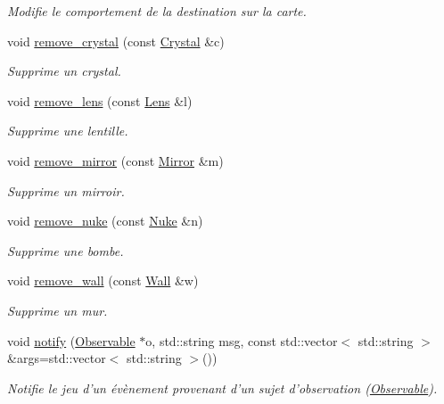 \begin{DoxyCompactItemize}
\begin{DoxyCompactList}\small\item\em Modifie le comportement de la destination sur la carte. \end{DoxyCompactList}\item 
void \hyperlink{classLevel_a764f18515935d4b707fd00c8889147fc}{remove\+\_\+crystal} (const \hyperlink{classCrystal}{Crystal} \&c)
\begin{DoxyCompactList}\small\item\em Supprime un crystal. \end{DoxyCompactList}\item 
void \hyperlink{classLevel_acbde0a8bba52e8f7410fc8def32d29e5}{remove\+\_\+lens} (const \hyperlink{classLens}{Lens} \&l)
\begin{DoxyCompactList}\small\item\em Supprime une lentille. \end{DoxyCompactList}\item 
void \hyperlink{classLevel_a32f71b8f1a06fc1be2fec511c47e5aec}{remove\+\_\+mirror} (const \hyperlink{classMirror}{Mirror} \&m)
\begin{DoxyCompactList}\small\item\em Supprime un mirroir. \end{DoxyCompactList}\item 
void \hyperlink{classLevel_ab88f940133cdc4c052ef48b36269e069}{remove\+\_\+nuke} (const \hyperlink{classNuke}{Nuke} \&n)
\begin{DoxyCompactList}\small\item\em Supprime une bombe. \end{DoxyCompactList}\item 
void \hyperlink{classLevel_a0ee86d08a44f0dfca782e7203f830fd1}{remove\+\_\+wall} (const \hyperlink{classWall}{Wall} \&w)
\begin{DoxyCompactList}\small\item\em Supprime un mur. \end{DoxyCompactList}\item 
void \hyperlink{classLevel_adad9e9736501636ce719b5df3725a51f}{notify} (\hyperlink{classObservable}{Observable} $\ast$o, std\+::string msg, const std\+::vector$<$ std\+::string $>$ \&args=std\+::vector$<$ std\+::string $>$())
\begin{DoxyCompactList}\small\item\em Notifie le jeu d'un évènement provenant d'un sujet d'observation (\hyperlink{classObservable}{Observable}). \end{DoxyCompactList}\end{DoxyCompactItemize}
